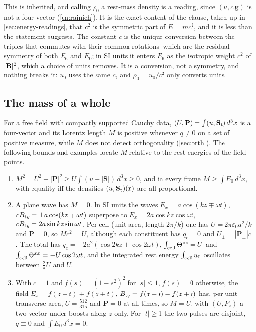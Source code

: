 This is inherited, and calling $\rho_0$ a rest-mass density is a reading, since $(u,c\,\mathbf g)$ is not a four-vector (\cref{en:rainich}).
It is the exact content of the clause, taken up in \cref{sec:energy-readings}, that $c^2$ is the symmetric part of $E=mc^2$, and it is less than the statement suggests. The constant $c$
is the unique conversion between the triples that commutes with their common rotations, which are the residual symmetry of both $E_6$ and $E_0$;
in SI units it enters $E_6$ as the isotropic weight $c^2$ of $|\mathbf B|^2$, which a choice of units removes. It is a conversion, not a symmetry, and
nothing breaks it: $u_0$ uses the same $c$, and $\rho_0=u_0/c^2$ only converts units.

\subsection{The mass of a whole}
\label{sec:energy-whole}

For a free field with compactly supported Cauchy data, $(U,\mathbf P)=\int(u,\mathbf S_{\rm t})\,d^3x$ is a four-vector and its Lorentz length $M$
is positive whenever $q\neq0$ on a set of positive measure, while $M$ does not detect orthogonality (\cref{sec:orth}). The following bounds and
examples locate $M$ relative to the rest energies of the field points.

\begin{proposition}
\label{en:whole}
\begin{enumerate}[label=(\roman*),leftmargin=2.2em]
\item $M^2=U^2-|\mathbf P|^2\ge U\int(u-|\mathbf S|)\,d^3x\ge0$, and in every frame $M\ge\int E_0\,d^3x$, with equality iff the densities
$(u,\mathbf S_{\rm t})(x)$ are all proportional.
\item A plane wave has $M=0$. In SI units the waves $E_x=a\cos(kz\mp\omega t)$, $cB_{{\rm t}y}=\pm a\cos(kz\mp\omega t)$ superpose to
$E_x=2a\cos kz\cos\omega t$, $cB_{{\rm t}y}=2a\sin kz\sin\omega t$. Per cell (unit area, length $2\pi/k$) one has $U=2\pi\varepsilon_0a^2/k$ and
$\mathbf P=0$, so $Mc^2=U$, although each constituent has $q_c=0$ and $U_\pm=|\mathbf P_\pm|c$. The total has $q_c=-2a^2(\cos2kz+\cos2\omega t)$,
$\int_{\rm cell}\Theta^{zz}=U$ and $\int_{\rm cell}\Theta^{xx}=-U\cos2\omega t$, and the integrated rest energy $\int_{\rm cell}u_0$ oscillates between
$\tfrac2\pi U$ and $U$.
\item With $c=1$ and $f(s)=(1-s^2)^2$ for $|s|\le1$, $f(s)=0$ otherwise, the field $E_x=f(z-t)+f(z+t)$, $B_{{\rm t}y}=f(z-t)-f(z+t)$ has, per unit
transverse area, $U=\tfrac{512}{315}$ and $\mathbf P=0$ at all times, so $M=U$, with $(U,P_z)$ a two-vector under boosts along $z$ only. For $|t|\ge1$
the two pulses are disjoint, $q\equiv0$ and $\int E_0\,d^3x=0$.
\end{enumerate}
\end{proposition}

